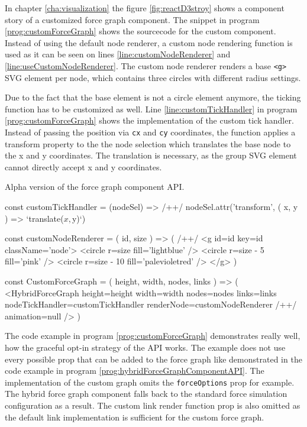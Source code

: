 In chapter \ref{cha:visualization} the figure \ref{fig:reactD3stroy} shows a component story of a customized force graph component. The snippet in program \ref{prog:customForceGraph} shows the sourcecode for the custom component. Instead of using the default node renderer, a custom node rendering function is used as it can be seen on lines \ref{line:customNodeRenderer} and \ref{line:useCustomNodeRenderer}. The custom node renderer renders a base \texttt{<g>} SVG element per node, which contains three circles with different radius settings. 

Due to the fact that the base element is not a circle element anymore, the ticking function has to be customized as well. Line \ref{line:customTickHandler} in program \ref{prog:customForceGraph} shows the implementation of the custom tick handler. Instead of passing the position via \texttt{cx} and \texttt{cy} coordinates, the function applies a transform property to the the node selection which translates the base node to the x and y coordinates. The translation is necessary, as the group SVG element cannot directly accept x and y coordinates.

\begin{program}
\caption{Alpha version of the force graph component API.}
\label{prog:customForceGraph}
\begin{JsCode}
const customTickHandler = (nodeSel) => /+\label{line:customTickHandler}+/ 
  nodeSel.attr('transform', ({ x, y }) => `translate(${x},${y})`)

const customNodeRenderer = ({ id, size }) => ( /+\label{line:customNodeRenderer}+/ 
  <g id={id} key={id} className={'node'}>
    <circle r={size} fill={'lightblue'} />
    <circle r={size - 5} fill={'pink'} />
    <circle r={size - 10} fill={'palevioletred'} />
  </g>
)

const CustomForceGraph = ({ height, width, nodes, links }) => (
  <HybridForceGraph
    height={height}
    width={width}
    nodes={nodes}
    links={links}
    nodeTickHandler={customTickHandler}
    renderNode={customNodeRenderer} /+\label{line:useCustomNodeRenderer}+/ 
    animation={null}
  />
)
\end{JsCode}
\end{program}

The code example in program \ref{prog:customForceGraph} demonstrates really well, how the graceful opt-in strategy of the API works. The example does not use every possible prop that can be added to the force graph like demonstrated in the code example in program \ref{prog:hybridForceGraphComponentAPI}. The implementation of the custom graph omits the \texttt{forceOptions} prop for example. The hybrid force graph component falls back to the standard force simulation configuration as a result. The custom link render function prop is also omitted as the default link implementation is sufficient for the custom force graph.


